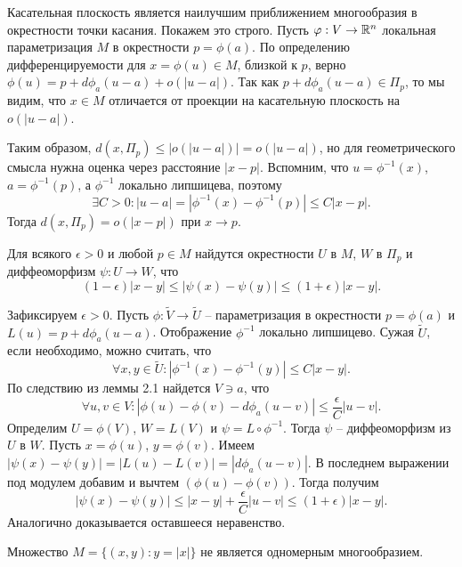 \begin{note}
	Касательная плоскость является наилучшим приближением многообразия в окрестности точки касания. Покажем это строго.
	Пусть $\varphi : V \to \mathbb{R}^n$ локальная параметризация $M$ в окрестности $p = \phi(a)$.
	По определению дифференцируемости для $x = \phi(u) \in M$, близкой к $p$, верно $\phi(u) = p + d \phi_a(u - a) + o(|u - a|)$.
	Так как $p + d \phi_a(u - a) \in \Pi_p$, то мы видим, что $x \in M$ отличается от проекции на касательную плоскость на $o(|u-a|)$.

	\vspace{5pt}
	Таким образом, $d(x, \Pi_p) \leq |o(|u-a|)| = o(|u-a|)$, но для геометрического смысла нужна оценка через расстояние $|x-p|$.
	Вспомним, что $u = \phi^{-1}(x)$, $a = \phi^{-1}(p)$, а $\phi^{-1}$ локально липшицева, поэтому 
	\[ \exists C > 0 : |u - a| = |\phi^{-1}(x) - \phi^{-1}(p)| \leq C |x-p|. \]
	Тогда $d(x, \Pi_p) = o(|x-p|)$ при $x \to p$. 
\end{note}


\begin{lemma}
	Для всякого $\epsilon > 0$ и любой $p \in M$ найдутся окрестности $U$ в $M$, $W$ в $\Pi_p$ и 
	диффеоморфизм $\psi : U \to W$, что
	\[ (1-\epsilon) |x-y| \leq |\psi(x) - \psi(y)| \leq (1+\epsilon) |x-y|. \] 
\end{lemma}

\begin{myproof}
	Зафиксируем $\epsilon > 0$. Пусть $\phi : \widetilde{V} \to \widetilde{U}$ -- параметризация в окрестности $p = \phi(a)$ и 
	$L(u) = p + d \phi_a (u - a)$. Отображение $\phi^{-1}$ локально липшицево. 
	Сужая $\widetilde{U}$, если необходимо, можно считать, что 
	\[ \forall x, y \in \widetilde{U} : |\phi^{-1}(x) - \phi^{-1}(y)| \leq C |x-y|. \]
	По следствию из леммы 2.1 найдется $V \ni a$, что 
	\[ \forall u, v \in V : |\phi(u) - \phi(v) - d \phi_a (u-v)| \leq \frac{\epsilon}{C} |u - v|. \]
	Определим $U = \phi(V)$, $W = L (V)$ и $\psi = L \circ \phi^{-1}$. 
	Тогда $\psi$ -- диффеоморфизм из $U$ в $W$. 
	Пусть $x = \phi(u)$, $y = \phi(v)$. 
	Имеем $|\psi(x) - \psi(y)| = |L(u) - L(v)| = |d \phi_a (u-v)|$. 
	В последнем выражении под модулем добавим и вычтем $(\phi(u) - \phi(v))$. 
	Тогда получим 
	\[ |\psi(x) - \psi(y)| \leq |x - y| + \frac{\epsilon}{C} |u - v| \leq (1 + \epsilon) |x - y|. \]
	Аналогично доказывается оставшееся неравенство.
\end{myproof}

\begin{example}
	Множество $M = \{(x, y) : y = |x|\}$ не является одномерным многообразием. 
\end{example}

